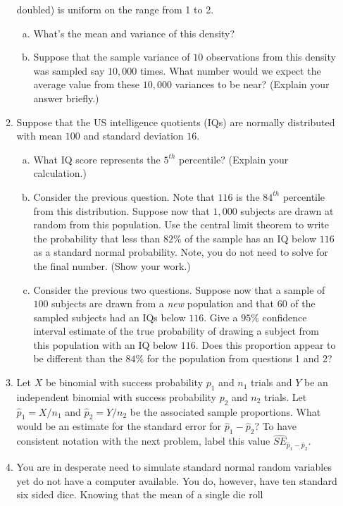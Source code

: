 \documentclass[12pt]{article}
\begin{document}
\begin{enumerate}[1.]
\begin{enumerate}[1.]
doubled) is uniform on the range from 1 to 2.
\begin{enumerate}[a.]
\item What's the mean and variance of this density?
\item Suppose that the sample variance of $10$ observations from this
  density was sampled say $10,000$ times. What number would we expect
  the average value from these $10,000$ variances to be near? (Explain
  your answer briefly.)
\end{enumerate}
\item Suppose that the US intelligence quotients (IQs) are normally
  distributed with mean $100$ and standard deviation $16$.
  \begin{enumerate}[a.]
  \item  What IQ
    score represents the $5^{th}$ percentile? (Explain your calculation.)
  \item Consider the previous question. Note that $116$ is the
    $84^{th}$ percentile from this distribution. Suppose now that
    $1,000$ subjects are drawn at random from this population. Use the
    central limit theorem to write the probability that less than
    $82\%$ of the sample has an IQ below $116$ as a standard normal
    probability. Note, you do not need to solve for the final number. (Show your work.) 
  \item Consider the previous two questions. Suppose now that a sample
    of $100$ subjects are drawn from a {\em new} population and that
    $60$ of the sampled subjects had an IQs below $116$. Give a $95\%$
    confidence interval estimate of the true probability of drawing a
    subject from this population with an IQ below $116$. Does this proportion
    appear to be different than the $84\%$ for the population from questions 1 and 2?
  \end{enumerate}
\item Let $X$ be binomial with success probability $p_1$ and $n_1$
    trials and $Y$ be an independent binomial with success probability
    $p_2$ and $n_2$ trials.  Let $\hat p_1 = X / n_1$ and $\hat p_2 =
    Y / n_2$ be the associated sample proportions. What would be an
    estimate for the standard error for $\hat p_1 - \hat p_2$? To have
    consistent notation with the next problem, label
    this value $\hat{SE}_{\hat p_1 - \hat p_2}$.
\item You are in desperate need to simulate standard normal random
  variables yet do not have a computer available. You do, however, have
  ten standard six sided dice. Knowing that the mean of a single die roll

\end{enumerate}
\end{enumerate}
\end{document}
